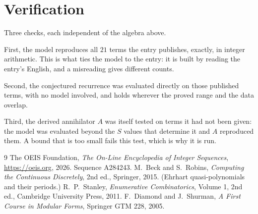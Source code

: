 \documentclass[11pt,a4paper]{article}
\theoremstyle{plain}
\theoremstyle{definition}
\begin{document}
\section{Verification}

Three checks, each independent of the algebra above.

First, the model reproduces all $21$ terms the entry publishes, exactly, in integer
arithmetic. This is what ties the model to the entry: it is built by reading the entry's
English, and a misreading gives different counts.

Second, the conjectured recurrence was evaluated directly on those published terms, with no
model involved, and holds wherever the proved range and the data overlap.

Third, the derived annihilator $A$ was itself tested on terms it had not been given: the model
was evaluated beyond the $S$ values that determine it and $A$ reproduced them. A bound that is
too small fails this test, which is why it is run.

\begin{thebibliography}{9}
 The OEIS Foundation, \emph{The On-Line Encyclopedia of Integer
Sequences}, \url{https://oeis.org}, 2026. Sequence A284243.
 M.~Beck and S.~Robins, \emph{Computing the Continuous Discretely},
2nd ed., Springer, 2015. (Ehrhart quasi-polynomials and their periods.)
 R.~P.~Stanley, \emph{Enumerative Combinatorics}, Volume 1, 2nd ed.,
Cambridge University Press, 2011.
 F.~Diamond and J.~Shurman, \emph{A First Course in Modular Forms},
Springer GTM 228, 2005.
\end{thebibliography}
\end{document}
